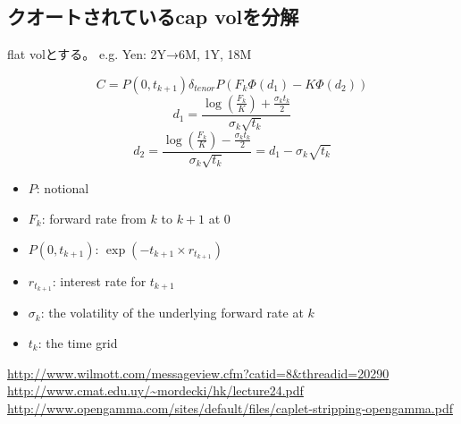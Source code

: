 \documentclass[platex]{jsarticle}
\numberwithin{equation}{section}
\begin{document}
\subsection{クオートされているcap volを分解}


flat volとする。
e.g.
Yen: 
2Y→6M, 1Y, 18M

\begin{equation}
 C = P(0, t_{k+1})\delta_{tenor}P(F_k\Phi(d_1) - K\Phi(d_2) )
\end{equation}
\begin{equation}
d_1 = \frac{\log(\frac{F_k}{K}) + \frac{\sigma_kt_k}{2}}{\sigma_k\sqrt{t_k}}
\end{equation}
\begin{equation}
d_2 = \frac{\log(\frac{F_k}{K}) - \frac{\sigma_kt_k}{2}}{\sigma_k\sqrt{t_k}} = d_1 - \sigma_k \sqrt{t_k}
\end{equation}


\begin{itemize}
\item $P$: notional
\item $F_k$: forward rate from $k$ to $k+1$ at 0 
\item $P(0, t_{k+1})$: $\exp(-t_{k+1} \times r_{t_{k+1}})$
\item $r_{t_{k+1}}$: interest rate for $t_{k+1}$
\item $\sigma_k$: the volatility of the underlying forward rate at $k$
\item $t_{k}$: the time grid
\end{itemize}


\begin{thebibliography}{10}
 \url{http://www.wilmott.com/messageview.cfm?catid=8&threadid=20290}
 \url{http://www.cmat.edu.uy/~mordecki/hk/lecture24.pdf}
 \url{http://www.opengamma.com/sites/default/files/caplet-stripping-opengamma.pdf}
\end{thebibliography}
\end{document}
